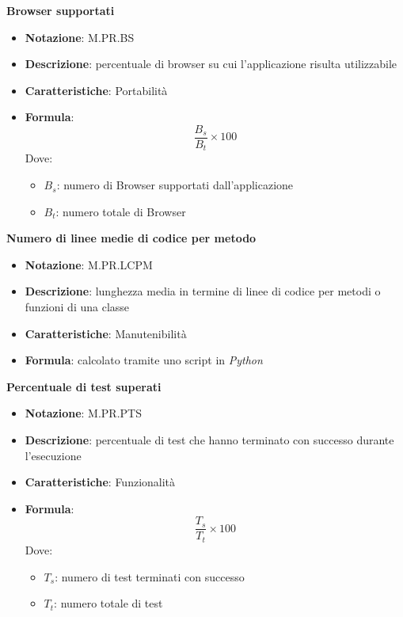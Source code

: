 \textbf{Browser supportati}
\begin{itemize}  
    \item \textbf{Notazione}: M.PR.BS
    \item \textbf{Descrizione}:  percentuale di browser su cui l'applicazione risulta utilizzabile
    \item \textbf{Caratteristiche}: Portabilità
    \item \textbf{Formula}: 
    \begin{equation}
        \frac{B_s}{B_t} \times 100
    \end{equation}
    Dove:
    \begin{itemize}
        \item $B_s$: numero di Browser supportati dall'applicazione
        \item $B_t$: numero totale di Browser
    \end{itemize}
\end{itemize}

\textbf{Numero di linee medie di codice per metodo}
\begin{itemize}  
    \item \textbf{Notazione}: M.PR.LCPM
    \item \textbf{Descrizione}:  lunghezza media in termine di linee di codice per metodi o funzioni di una classe
    \item \textbf{Caratteristiche}: Manutenibilità
    \item \textbf{Formula}: calcolato tramite uno script in \textit{Python}
\end{itemize}

\textbf{Percentuale di test superati}
\begin{itemize}  
    \item \textbf{Notazione}: M.PR.PTS
    \item \textbf{Descrizione}:  percentuale di test che hanno terminato con successo durante l'esecuzione
    \item \textbf{Caratteristiche}: Funzionalità
    \item \textbf{Formula}: 
    \begin{equation}
        \frac{T_s}{T_t} \times 100
    \end{equation}
    Dove:
    \begin{itemize}
        \item $T_s$: numero di test terminati con successo
        \item $T_t$: numero totale di test
    \end{itemize}
\end{itemize}

